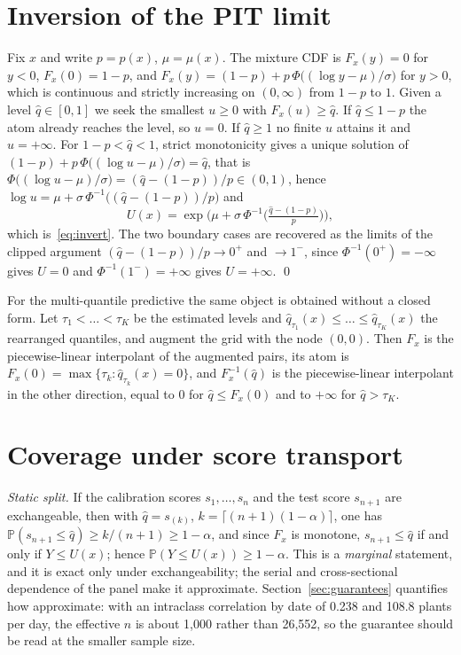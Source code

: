 \documentclass[preprint,3p,times]{elsarticle}
\begin{document}
\appendix

\section{Inversion of the PIT limit}
\label{app:inversion}

Fix $x$ and write $p=p(x)$, $\mu=\mu(x)$. The mixture CDF is $F_x(y)=0$ for $y<0$, $F_x(0)=1-p$, and $F_x(y)=(1-p)+p\,\Phi\big((\log y-\mu)/\sigma\big)$ for $y>0$, which is continuous and strictly increasing on $(0,\infty)$ from $1-p$ to $1$. Given a level $\hat q\in[0,1]$ we seek the smallest $u\ge 0$ with $F_x(u)\ge \hat q$. If $\hat q\le 1-p$ the atom already reaches the level, so $u=0$. If $\hat q\ge 1$ no finite $u$ attains it and $u=+\infty$. For $1-p<\hat q<1$, strict monotonicity gives a unique solution of $(1-p)+p\,\Phi\big((\log u-\mu)/\sigma\big)=\hat q$, that is $\Phi\big((\log u-\mu)/\sigma\big)=(\hat q-(1-p))/p\in(0,1)$, hence $\log u=\mu+\sigma\,\Phi^{-1}\big((\hat q-(1-p))/p\big)$ and
\[
U(x)=\exp\!\Big(\mu+\sigma\,\Phi^{-1}\big(\tfrac{\hat q-(1-p)}{p}\big)\Big),
\]
which is~\eqref{eq:invert}. The two boundary cases are recovered as the limits of the clipped argument $(\hat q-(1-p))/p\to 0^+$ and $\to 1^-$, since $\Phi^{-1}(0^+)=-\infty$ gives $U=0$ and $\Phi^{-1}(1^-)=+\infty$ gives $U=+\infty$. \qed

For the multi-quantile predictive the same object is obtained without a closed form. Let $\tau_1<\dots<\tau_K$ be the estimated levels and $\hat q_{\tau_1}(x)\le\dots\le\hat q_{\tau_K}(x)$ the rearranged quantiles, and augment the grid with the node $(0,0)$. Then $F_x$ is the piecewise-linear interpolant of the augmented pairs, its atom is $F_x(0)=\max\{\tau_k:\hat q_{\tau_k}(x)=0\}$, and $F_x^{-1}(\hat q)$ is the piecewise-linear interpolant in the other direction, equal to $0$ for $\hat q\le F_x(0)$ and to $+\infty$ for $\hat q>\tau_K$.

\section{Coverage under score transport}
\label{app:coverage}

\emph{Static split.} If the calibration scores $s_1,\dots,s_n$ and the test score $s_{n+1}$ are exchangeable, then with $\hat q=s_{(k)}$, $k=\lceil(n+1)(1-\alpha)\rceil$, one has $\mathbb{P}(s_{n+1}\le\hat q)\ge k/(n+1)\ge 1-\alpha$, and since $F_x$ is monotone, $s_{n+1}\le\hat q$ if and only if $Y\le U(x)$; hence $\mathbb{P}(Y\le U(x))\ge 1-\alpha$. This is a \emph{marginal} statement, and it is exact only under exchangeability; the serial and cross-sectional dependence of the panel make it approximate. Section~\ref{sec:guarantees} quantifies how approximate: with an intraclass correlation by date of 0.238 and 108.8 plants per day, the effective $n$ is about 1{,}000 rather than 26{,}552, so the guarantee should be read at the smaller sample size.
\end{document}
